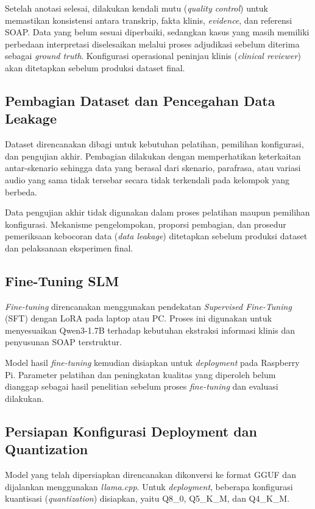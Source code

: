 Setelah anotasi selesai, dilakukan kendali mutu (\emph{quality control}) untuk memastikan konsistensi antara transkrip, fakta klinis, \emph{evidence}, dan referensi SOAP. Data yang belum sesuai diperbaiki, sedangkan kasus yang masih memiliki perbedaan interpretasi diselesaikan melalui proses adjudikasi sebelum diterima sebagai \emph{ground truth}. Konfigurasi operasional peninjau klinis (\emph{clinical reviewer}) akan ditetapkan sebelum produksi dataset final.

\subsection{Pembagian Dataset dan Pencegahan Data Leakage}
\label{subsec:dataleakage}

Dataset direncanakan dibagi untuk kebutuhan pelatihan, pemilihan konfigurasi, dan pengujian akhir. Pembagian dilakukan dengan memperhatikan keterkaitan antar-skenario sehingga data yang berasal dari skenario, parafrasa, atau variasi audio yang sama tidak tersebar secara tidak terkendali pada kelompok yang berbeda.

Data pengujian akhir tidak digunakan dalam proses pelatihan maupun pemilihan konfigurasi. Mekanisme pengelompokan, proporsi pembagian, dan prosedur pemeriksaan kebocoran data (\emph{data leakage}) ditetapkan sebelum produksi dataset dan pelaksanaan eksperimen final.

\subsection{Fine-Tuning SLM}
\label{subsec:finetuningslm}

\emph{Fine-tuning} direncanakan menggunakan pendekatan \emph{Supervised Fine-Tuning} (SFT) dengan LoRA pada laptop atau PC. Proses ini digunakan untuk menyesuaikan Qwen3-1.7B terhadap kebutuhan ekstraksi informasi klinis dan penyusunan SOAP terstruktur.

Model hasil \emph{fine-tuning} kemudian disiapkan untuk \emph{deployment} pada Raspberry Pi. Parameter pelatihan dan peningkatan kualitas yang diperoleh belum dianggap sebagai hasil penelitian sebelum proses \emph{fine-tuning} dan evaluasi dilakukan.

\subsection{Persiapan Konfigurasi Deployment dan Quantization}
\label{subsec:quantization}

Model yang telah dipersiapkan direncanakan dikonversi ke format GGUF dan dijalankan menggunakan \emph{llama.cpp}. Untuk \emph{deployment}, beberapa konfigurasi kuantisasi (\emph{quantization}) disiapkan, yaitu Q8\_0, Q5\_K\_M, dan Q4\_K\_M.

